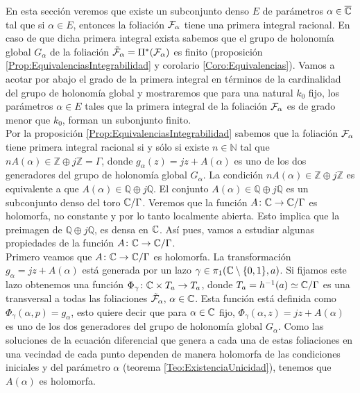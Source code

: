 En esta sección veremos que existe un subconjunto denso $E$ de parámetros $\alpha\in\overline{\mathbb{C}}$ tal que si $\alpha\in E$, entonces la foliación $\mathcal{F}_{\alpha}$ tiene una primera integral racional. En caso de que dicha primera integral exista sabemos que el grupo de holonomía global $G_{\alpha}$ de la foliación $\tilde{\mathcal{F}}_{\alpha}=\Pi^{*}(\mathcal{F}_{\alpha})$ es finito (proposición \ref{Prop:EquivalenciasIntegrabilidad} y corolario \ref{Coro:Equivalencias}). Vamos a acotar por abajo el grado de la primera integral en términos de la cardinalidad del grupo de holonomía global y mostraremos que para una natural $k_{0}$ fijo, los parámetros $\alpha\in E$ tales que la primera integral de la foliación $\mathcal{F}_{\alpha}$ es de grado menor que $k_{0}$, forman un subonjunto finito.\\

Por la proposición \ref{Prop:EquivalenciasIntegrabilidad} sabemos que la foliación $\mathcal{F}_{\alpha}$ tiene primera integral racional si y sólo si existe $n\in\mathbb{N}$ tal que $nA(\alpha)\in\mathbb{Z}\oplus j\mathbb{Z}=\Gamma$, donde $g_{\alpha}(z)=jz+A(\alpha)$ es uno de los dos generadores del grupo de holonomía global $G_{\alpha}$. La condición $nA(\alpha)\in\mathbb{Z}\oplus j\mathbb{Z}$ es equivalente a que $A(\alpha)\in\mathbb{Q}\oplus j\mathbb{Q}$. El conjunto $A(\alpha)\in\mathbb{Q}\oplus j\mathbb{Q}$ es un subconjunto denso del toro $\mathbb{C}/\Gamma$. Veremos que la función $A\colon\mathbb{C}\rightarrow\mathbb{C}/\Gamma$ es holomorfa, no constante y por lo tanto localmente abierta. Esto implica que la preimagen de $\mathbb{Q}\oplus j\mathbb{Q}$, es densa en $\mathbb{C}$. Así pues, vamos a estudiar algunas propiedades de la función $A\colon\mathbb{C}\rightarrow \mathbb{C}/\Gamma$.\\

Primero veamos que $A\colon\mathbb{C}\rightarrow\mathbb{C}/\Gamma$ es holomorfa. La transformación $g_{\alpha}=jz+A(\alpha)$ está generada por un lazo $\gamma\in\pi_{1}(\mathbb{C}\setminus\{0,1\},a)$. Si fijamos este lazo obtenemos una función $\Phi_{\gamma}\colon\mathbb{C}\times T_{a}\rightarrow T_{a}$, donde $T_{a}=h^{-1}(a)\simeq\mathbb{C}/\Gamma$ es una transversal a todas las foliaciones $\tilde{\mathcal{F}}_{\alpha},\, \alpha\in\mathbb{C}$. Esta función está definida como $\Phi_{\gamma}(\alpha,p)=g_{\alpha}$, esto quiere decir que para $\alpha\in\mathbb{C}$ fijo, $\Phi_{\gamma}(\alpha,z)=jz+A(\alpha)$ es uno de los dos generadores del grupo de holonomía global $G_{\alpha}$. Como las soluciones de la ecuación diferencial que genera a cada una de estas foliaciones en una vecindad de cada punto dependen de manera holomorfa de las condiciones iniciales y del parámetro $\alpha$ (teorema \ref{Teo:ExistenciaUnicidad}), tenemos que $A(\alpha)$ es holomorfa.\\

